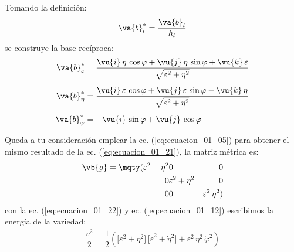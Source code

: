 Tomando la definición:
\begin{align*}
\va{b}_{l}^{*} = \dfrac{\va{b}_{l}}{h_{l}}
\end{align*}
se construye la base recíproca:
\begin{align}
\begin{aligned}
\va{b}_{\varepsilon}^{*} &= \dfrac{\vu{i} \, \eta \, \cos \varphi + \vu{j} \, \eta \, \sin \varphi + \vu{k} \, \varepsilon}{\sqrt{\varepsilon^{2} + \eta^{2}}} \\[0.5em]
\va{b}_{\eta}^{*} &= \dfrac{\vu{i} \, \varepsilon \, \cos \varphi + \vu{j} \, \varepsilon \, \sin \varphi - \vu{k} \, \eta}{\sqrt{\varepsilon^{2} + \eta^{2}}} \\[0.5em]
\va{b}_{\varphi}^{*} &= - \vu{i} \, \sin \varphi + \vu{j} \, \cos \varphi
\end{aligned}
\label{eq:ecuacion_01_21}
\end{align}

Queda a tu consideración emplear la ec. (\ref{eq:ecuacion_01_05}) para obtener el mismo resultado de la ec. (\ref{eq:ecuacion_01_21}), la matriz métrica es:
\begin{align}
\vb{g} = \mqty(
\varepsilon^{2} + \eta^{2} & 0 &  0 \\
0 & \varepsilon^{2} + \eta^{2} &  0 \\
0 & 0 & \varepsilon^{2} \, \eta^{2} )
\label{eq:ecuacion_01_22}
\end{align}
con la ec. (\ref{eq:ecuacion_01_22}) y ec. (\ref{eq:ecuacion_01_12}) escribimos la energía de la variedad:
\begin{align}
\dfrac{v^{2}}{2} = \dfrac{1}{2} \left( \big[ \varepsilon^{2} + \eta^{2} \big] \, \big[ \dot{\varepsilon}^{2} + \dot{\eta}^{2} \big] + \varepsilon^{2} \, \eta^{2} \, \dot{\varphi}^{2} \right)
\label{eq:ecuacion_01_23}
\end{align}

